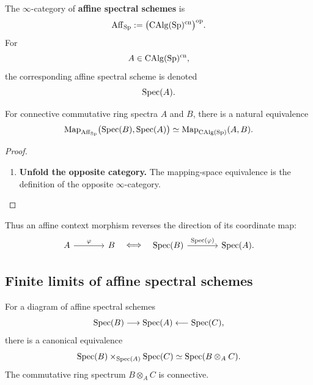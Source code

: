 \begin{definition}
\label{def:affine-spectral-scheme}
The $\infty$-category of \textbf{affine spectral schemes} is
\[
    \operatorname{Aff}_{\operatorname{Sp}}
    :=
    \bigl(\operatorname{CAlg}(\operatorname{Sp})^{\mathrm{cn}}\bigr)^{\mathrm{op}}.
\]
For
\[
    A\in\operatorname{CAlg}(\operatorname{Sp})^{\mathrm{cn}},
\]
the corresponding affine spectral scheme is denoted
\[
    \operatorname{Spec}(A).
\]
\end{definition}

\begin{proposition}
\label{prop:affine-spectral-mapping-spaces}
For connective commutative ring spectra $A$ and $B$, there is a natural
equivalence
\[
    \operatorname{Map}_{\operatorname{Aff}_{\operatorname{Sp}}}
    \bigl(
        \operatorname{Spec}(B),
        \operatorname{Spec}(A)
    \bigr)
    \simeq
    \operatorname{Map}_{\operatorname{CAlg}(\operatorname{Sp})}(A,B).
\]
\end{proposition}

\begin{proof}
\leavevmode
\begin{enumerate}[label=\textup{(\arabic*)}]
    \item \textbf{Unfold the opposite category.}
    The mapping-space equivalence is the definition of the opposite $\infty$-category.
\end{enumerate}
\end{proof}

Thus an affine context morphism reverses the direction of its coordinate map:
\[
\begin{tikzcd}[column sep=large]
    A
        \arrow[r, "\varphi"]
    &
    B
        \arrow[r, phantom, "\Longleftrightarrow" description]
    &
    \Spec(B)
        \arrow[r, "{\Spec(\varphi)}"]
    &
    \Spec(A).
\end{tikzcd}
\]

\subsection{Finite limits of affine spectral schemes}

\begin{proposition}
\label{prop:affine-spectral-fibre-products}
For a diagram of affine spectral schemes
\[
    \operatorname{Spec}(B)
    \longrightarrow
    \operatorname{Spec}(A)
    \longleftarrow
    \operatorname{Spec}(C),
\]
there is a canonical equivalence
\[
    \operatorname{Spec}(B)
    \times_{\operatorname{Spec}(A)}
    \operatorname{Spec}(C)
    \simeq
    \operatorname{Spec}(B\otimes_A C).
\]
The commutative ring spectrum $B\otimes_A C$ is connective.
\end{proposition}

